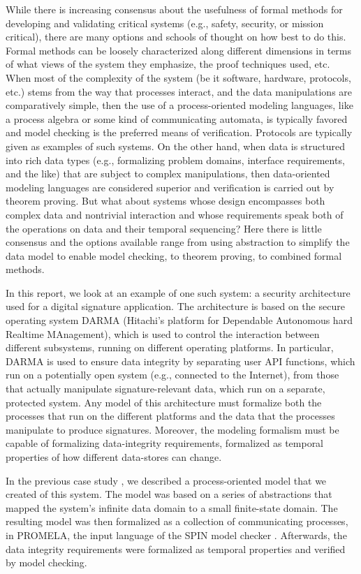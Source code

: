 \documentclass[a4paper,pdftex]{article}
\begin{document}
While there is increasing consensus about the usefulness of formal
methods for developing and validating critical systems (e.g., safety,
security, or mission critical), there are many options and schools of
thought on how best to do this. Formal methods can be loosely
characterized along different dimensions in terms of what views of the
system they emphasize, the proof techniques used, etc.  When most of the
complexity of the system (be it software, hardware, protocols, etc.)
stems from the way that processes interact, and the data manipulations
are comparatively simple, then the use of a process-oriented modeling
languages, like a process algebra or some kind of communicating
automata, is typically favored and model checking is the preferred means
of verification.  Protocols are typically given as examples of such
systems.  On the other hand, when data is structured into rich data
types (e.g., formalizing problem domains, interface requirements, and
the like) that are subject to complex manipulations, then data-oriented
modeling languages are considered superior and verification is carried
out by theorem proving.  But what about systems whose design encompasses
both complex data and nontrivial interaction and whose requirements
speak both of the operations on data and their temporal sequencing?
Here there is little consensus and the options available range from
using abstraction to simplify the data model to enable model checking,
to theorem proving, to combined formal methods.

In this report, we look at an example of one such system: a security
architecture used for a digital signature application.  The architecture
is based on the secure operating system DARMA (Hitachi's platform
for Dependable Autonomous hard Realtime MAnagement),
which is used to control the interaction
between different subsystems, running on different operating platforms.
In particular, DARMA is used to ensure data integrity by separating user
API functions, which run on a potentially open system (e.g., connected
to the Internet), from those that actually manipulate signature-relevant
data, which run on a separate, protected system.  Any model of this
architecture must formalize both the processes that run on the different
platforms and the data that the processes manipulate to produce signatures.
Moreover, the modeling formalism must be capable of formalizing
data-integrity requirements, formalized as temporal properties of how
different data-stores can change.

In the previous case study \cite{iicis03}, we described a process-oriented
model that we created of this system.  The model was based on 
a series of abstractions that mapped the system's infinite 
data domain to a small finite-state domain.  The resulting model
was then formalized as a collection of communicating processes,
in PROMELA, the input language of the SPIN model checker
\cite{holzmann97model}.   Afterwards, the data integrity requirements
were formalized as temporal properties and verified by
model checking.
\end{document}
